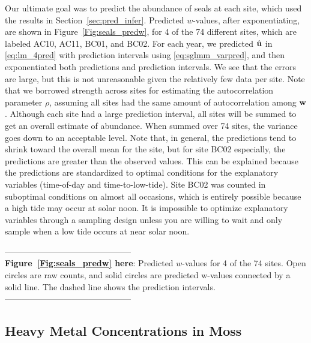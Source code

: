 \documentclass[12pt, titlepage]{article}
\begin{document}
Our ultimate goal was to predict the abundance of seals at each site, which used the results in Section~\ref{sec:pred_infer}.  Predicted $w$-values, after exponentiating, are shown in Figure~\ref{Fig:seals_predw}, for 4 of the 74 different sites, which are labeled AC10, AC11, BC01, and BC02.  For each year, we predicted $\hat{\mathbf{u}}$ in \eqref{eq:lm_4pred} with prediction intervals using \eqref{eq:sglmm_varpred}, and then exponentiated both predictions and prediction intervals.  We see that the errors are large, but this is not unreasonable given the relatively few data per site.  Note that we borrowed strength across sites for estimating the autocorrelation parameter $\rho$, assuming all sites had the same amount of autocorrelation among $\mathbf{w}$.  Although each site had a large prediction interval, all sites will be summed to get an overall estimate of abundance.  When summed over 74 sites, the variance goes down to an acceptable level.  Note that, in general, the predictions tend to shrink toward the overall mean for the site, but for site BC02 especially, the predictions are greater than the observed values.  This can be explained because the predictions are standardized to optimal conditions for the explanatory variables (time-of-day and time-to-low-tide). Site BC02 was counted in suboptimal conditions on almost all occasions, which is entirely possible because a high tide may occur at solar noon. It is impossible to optimize explanatory variables through a sampling design unless you are willing to wait and only sample when a low tide occurs at near solar noon.

\begin{spacing}{0.8}
\vspace{.4cm}
\noindent --------------------------------------------- \\
\textbf{Figure~\ref{Fig:seals_predw} here}: Predicted $w$-values for 4 of the 74 sites.  Open circles are raw counts, and solid circles are predicted w-values connected by a solid line.  The dashed line shows the prediction intervals. \\
--------------------------------------------- \\ 
\end{spacing}



\subsection{Heavy Metal Concentrations in Moss}
\end{document}

